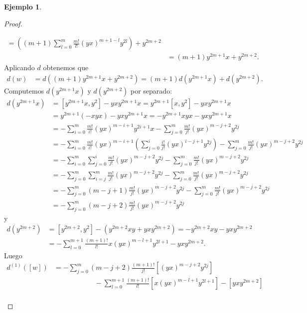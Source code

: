\documentclass[a4paper,oneside,fleqn,11pt]{report}
\theoremstyle{definition}
\theoremstyle{definition}
\newtheorem{example}{Ejemplo}[section]
\numberwithin{prop}{subsection}
\begin{document}
\begin{example}
\begin{proof}
\begin{itemize}
\begin{align*}
					= \left((m + 1)\sum_{l = 0}^m\frac{m!}{l!}(yx)^{m + 1 - l}y^{2l}\right) + y^{2m + 2} \\
				&= (m + 1)y^{2m + 1}x + y^{2m + 2}.
			\end{align*}	
			Aplicando $d$ obtenemos que
			\begin{align*}
				d(w) &= d((m + 1)y^{2m + 1}x + y^{2m + 2}) = (m + 1)d(y^{2m + 1}x) + d(y^{2m + 2}).		
			\end{align*}
			Computemos $d(y^{2m + 1}x)$ y $d(y^{2m + 2})$ por separado:
			\begin{align*}
				d(y^{2m + 1}x) &= \left[y^{2m + 1}x, y^2\right] - yxy^{2m + 1}x = y^{2m + 1}\left[x,y^2\right] - yxy^{2m + 1}x\\
				&= y^{2m + 1}(-xyx) - yxy^{2m + 1}x = -y^{2m + 1}xyx - yxy^{2m + 1}x\\
				&= -\sum_{i = 0}^m\frac{m!}{i!}(yx)^{m -i + 1}y^{2i +1}x - \sum_{j = 0}^{m}\frac{m!}{j!}(yx)^{m -j + 2}y^{2j} \\
				&= -\sum_{i = 0}^m\frac{m!}{i!}(yx)^{m -i + 1}\left(\sum_{j = 0}^{i}\frac{i!}{j!}(yx)^{i - j + 1}y^{2j}\right)
					- \sum_{j = 0}^{m}\frac{m!}{j!}(yx)^{m -j + 2}y^{2j} \\
				&= -\sum_{i = 0}^m\sum_{j = 0}^i\frac{m!}{j!}(yx)^{m -j + 2}y^{2j}
					- \sum_{j = 0}^{m}\frac{m!}{j!}(yx)^{m -j + 2}y^{2j} \\
				&= -\sum_{j = 0}^m\sum_{i = j}^m\frac{m!}{j!}(yx)^{m -j + 2}y^{2j}
					- \sum_{j = 0}^{m}\frac{m!}{j!}(yx)^{m -j + 2}y^{2j} \\
				&= -\sum_{j = 0}^m(m - j + 1)\frac{m!}{j!}(yx)^{m -j + 2}y^{2j}
					- \sum_{j = 0}^{m}\frac{m!}{j!}(yx)^{m -j + 2}y^{2j} \\
				&= -\sum_{j = 0}^m(m - j + 2)\frac{m!}{j!}(yx)^{m -j + 2}y^{2j}
			\end{align*}
			y
			\begin{align*}
				d(y^{2m + 2}) &= \left[y^{2m + 2}, y^2\right] - (y^{2m +2}xy + yxy^{2m + 2}) = - y^{2m +2}xy - yxy^{2m + 2} \\
				&= -\sum_{l = 0}^{m + 1}\frac{(m + 1)!}{l!}x(yx)^{m - l + 1}y^{2l + 1} - yxy^{2m + 2}.
			\end{align*}
			Luego
			\begin{align*}
				d^{(1)}(\left[w\right]) &=
					-\sum_{j = 0}^m(m - j + 2)\frac{(m + 1)!}{j!}\left[(yx)^{m -j + 2}y^{2j}\right]\\
				&\hspace{70pt}-\sum_{l = 0}^{m + 1}\frac{(m + 1)!}{l!}\left[x(yx)^{m - l + 1}y^{2l + 1}\right]
						- \left[yxy^{2m + 2}\right]\\

\end{align*}
\end{itemize}
\end{proof}
\end{example}
\end{document}
